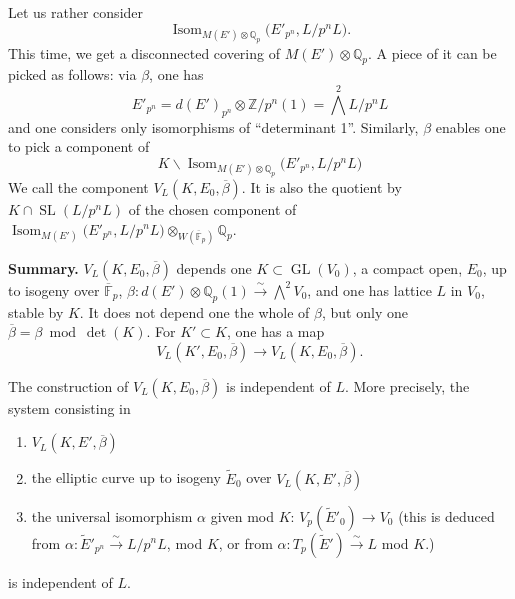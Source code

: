 \documentclass[11pt,a4paper]{article}
\theoremstyle{plain}
\theoremstyle{definition}
\theoremstyle{remark}
\DeclareMathOperator{\Isom}{Isom}
\DeclareMathOperator{\GL}{GL}
\DeclareMathOperator{\SL}{SL}
\newcommand{\Z}{\mathbb{Z}}
\newcommand{\Fpbar}{\overline{\mathbb{F}}_{p}}
\newcommand{\Qp}{\mathbb{Q}_{p}}
\newcommand{\Vp}{V_{p}}
\newcommand{\Tp}{T_{p}}
\begin{document}
Let us rather consider
\[
\Isom_{M(E') \otimes \Qp}\bigl(E'_{p^{n}}, L/p^{n}L\bigr).
\]
This time, we get a disconnected covering of $M(E') \otimes \Qp$. A piece of it can be picked as follows: via $\beta$, one has
\[
E'_{p^{n}} = d(E')_{p^{n}} \otimes \Z/p^{n}(1) = \bigwedge^{2} L/p^{n}L
\]
and one considers only isomorphisms of ``determinant 1''. Similarly, $\beta$ enables one to pick a component of
\[
K \backslash \Isom_{M(E') \otimes \Qp}\bigl(E'_{p^{n}}, L/p^{n}L\bigr)
\]
We call the component $V_{L}(K, E_{0}, \overline{\beta})$. It is also the quotient by $K \cap \SL(L/p^{n}L)$ of the chosen component of $\Isom_{M(E')} \bigl(E'_{p^{n}}, L/p^{n}L\bigr) \otimes_{W(\Fpbar)} \Qp$.

\bigskip

\noindent
\textbf{Summary.} $V_{L}(K, E_{0}, \overline{\beta})$ depends one $K \subset \GL(V_{0})$, a compact open, $E_{0}$, up to isogeny over $\Fpbar$, $\beta : d(E') \otimes \Qp(1) \xrightarrow{\sim} \bigwedge^{2} V_{0}$, and one has lattice $L$ in $V_{0}$, stable by $K$. It does not depend one the whole of $\beta$, but only one $\overline{\beta} = \beta \bmod \det(K)$. For $K' \subset K$, one has a map
\[
V_{L}(K', E_{0}, \overline{\beta}) \to V_{L}(K, E_{0}, \overline{\beta}).
\]

The construction of $V_{L}(K, E_{0}, \overline{\beta})$ is independent of $L$. More precisely, the system consisting in
\begin{enumerate}[label=(\alph*)]
\item $V_{L}(K, E', \overline{\beta})$
\item the elliptic curve up to isogeny $\widetilde{E}_{0}$ over $V_{L}(K, E', \overline{\beta})$
\item the universal isomorphism $\alpha$ given mod $K$: $\Vp(\widetilde{E}'_{0}) \to V_{0}$ (this is deduced from $\alpha : \widetilde{E}'_{p^{n}} \xrightarrow{\sim} L/p^{n}L$, mod $K$, or from $\alpha : \Tp(\widetilde{E}') \xrightarrow{\sim} L$ mod $K$.)
\end{enumerate}
is independent of $L$.
\end{document}
